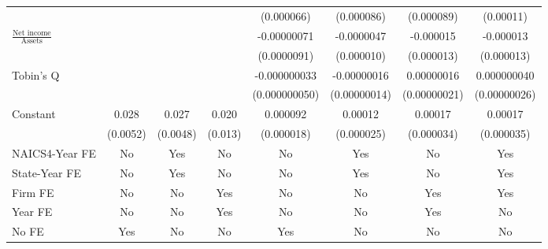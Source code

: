 {\begin{tabular}{l*{7}{c}}
                    &                     &                     &                     &  (0.000066)         &  (0.000086)         &  (0.000089)         &   (0.00011)         \\
\addlinespace
$\frac{\textrm{Net income}}{\textrm{Assets}}$&                     &                     &                     & -0.00000071         &  -0.0000047         &   -0.000015         &   -0.000013         \\
                    &                     &                     &                     & (0.0000091)         &  (0.000010)         &  (0.000013)         &  (0.000013)         \\
\addlinespace
Tobin's Q           &                     &                     &                     &-0.000000033         & -0.00000016         &  0.00000016         & 0.000000040         \\
                    &                     &                     &                     &(0.000000050)         &(0.00000014)         &(0.00000021)         &(0.00000026)         \\
\addlinespace
Constant            &       0.028\sym{***}&       0.027\sym{***}&       0.020         &    0.000092\sym{***}&     0.00012\sym{***}&     0.00017\sym{***}&     0.00017\sym{***}\\
                    &    (0.0052)         &    (0.0048)         &     (0.013)         &  (0.000018)         &  (0.000025)         &  (0.000034)         &  (0.000035)         \\
\addlinespace
NAICS4-Year FE      &          No         &         Yes         &          No         &          No         &         Yes         &          No         &         Yes         \\
\addlinespace
State-Year FE       &          No         &         Yes         &          No         &          No         &         Yes         &          No         &         Yes         \\
\addlinespace
Firm FE             &          No         &          No         &         Yes         &          No         &          No         &         Yes         &         Yes         \\
\addlinespace
Year FE             &          No         &          No         &         Yes         &          No         &          No         &         Yes         &          No         \\
\addlinespace
No FE               &         Yes         &          No         &          No         &         Yes         &          No         &          No         &          No         \\

\end{tabular}}
